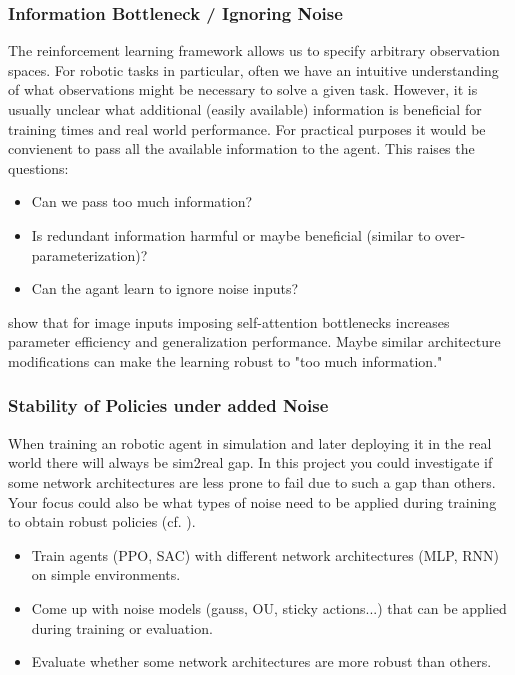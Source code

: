 \documentclass[a4paper]{article}
\begin{document}
\subsubsection{Information Bottleneck / Ignoring Noise}
The reinforcement learning framework allows us to specify arbitrary observation spaces.
For robotic tasks in particular, often we have an intuitive understanding of what observations might be necessary to solve a given task.
However, it is usually unclear what additional (easily available) information is beneficial for training times and real world performance.
For practical purposes it would be convienent to pass all the available information to the agent.
This raises the questions:
\begin{itemize}
  \item Can we pass too much information?
  \item Is redundant information harmful or maybe beneficial (similar to over-parameterization)?
  \item Can the agant learn to ignore noise inputs?
\end{itemize}
\citet{Tang2020} show that for image inputs imposing self-attention bottlenecks increases parameter efficiency and generalization performance.
Maybe similar architecture modifications can make the learning robust to "too much information."




\subsubsection{Stability of Policies under added Noise}
When training an robotic agent in simulation and later deploying it in the real world there will always be sim2real gap.
In this project you could investigate if some network architectures are less prone to fail due to such a gap than others.
Your focus could also be what types of noise need to be applied during training to obtain robust policies (cf. \citet{Sinha2021}).
\begin{itemize}
  \item Train agents (PPO, SAC) with different network architectures (MLP, RNN) on simple environments.
  \item Come up with noise models (gauss, OU, sticky actions...) that can be applied during training or evaluation.
  \item Evaluate whether some network architectures are more robust than others.
\end{itemize}
\end{document}
